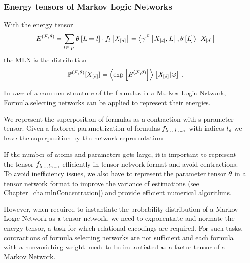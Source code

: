 


\subsubsection{Energy tensors of Markov Logic Networks}

With the energy tensor
\begin{align}
	E^{(\mathcal{F},\theta)} 
	= \sum_{l\in[p]} \theta\left[L=l\right] \cdot f_{l}\left[X_{[d]}\right] 
	= \left\langle \gamma^{\mathcal{F}}\left[X_{[d]},L\right],\theta\left[L\right]\right\rangle \left[ X_{[d]} \right] 
\end{align}
the MLN is the distribution
\begin{align}
	\mathbb{P}^{(\mathcal{F},\theta)}[X_{[d]}] = \left\langle \mathrm{exp}\left[E^{(\mathcal{F},\theta)}\right]\right\rangle \left[ X_{[d]} | \varnothing \right] \, . 
\end{align}

In case of a common structure of the formulas in a Markov Logic Network, Formula selecting networks can be applied to represent their energies.

We represent the superposition of formulas as a contraction with s parameter tensor.
Given a factored parametrization of formulas $f_{l_{0}\ldots l_{n-1}}$ with indices $l_{s}$ we have the superposition by the network representation:
\begin{center}
	
\end{center}


If the number of atoms and parameters gets large, it is important to represent the tensor ${f_{l_{0}\ldots l_{n-1}}}$ efficiently in tensor network format and avoid contractions.
To avoid inefficiency issues, we also have to represent the parameter tensor $\theta$ in a tensor network format to improve the variance of estimations (see Chapter~\ref{cha:mlnConcentration}) and provide efficient numerical algorithms.

However, when required to instantiate the probability distribution of a Markov Logic Network as a tensor network, we need to exponentiate and normate the energy tensor, a task for which relational encodings are required.
For such tasks, contractions of formula selecting networks are not sufficient and each formula with a nonvanishing weight needs to be instantiated as a factor tensor of a Markov Network. 






